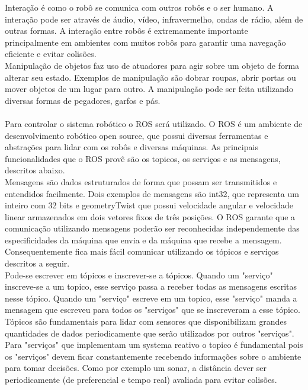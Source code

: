 \documentclass{article}
\begin{document}
Interação é como o robô se comunica com outros robôs e o ser humano. A interação pode ser através de áudio, vídeo, infravermelho, ondas de rádio, além de outras formas. A interação entre robôs é extremamente importante principalmente em ambientes com muitos robôs para garantir uma navegação eficiente e evitar colisões.\\

Manipulação de objetos faz uso de atuadores para agir sobre um objeto de forma alterar seu estado. Exemplos de manipulação são dobrar roupas, abrir portas ou mover objetos de um lugar para outro. A manipulação pode ser feita utilizando diversas formas de pegadores, garfos e pás. \\ \\

Para controlar o sistema robótico o ROS será utilizado. O ROS é um ambiente de desenvolvimento robótico open source, que possui diversas ferramentas e abstrações para lidar com os robôs e diversas máquinas. As principais funcionalidades que o ROS provê são os topicos, os serviços e as mensagens, descritos abaixo.\\
	Mensagens são dados estruturados de forma que possam ser transmitidos e entendidos facilmente. Dois exemplos de mensagens são int32, que representa um inteiro com 32 bits e geometryTwist que possui velocidade angular e velocidade linear armazenados em dois vetores fixos de três posições. O ROS garante que a comunicação utilizando mensagens poderão ser reconhecidas independemente das especificidades da máquina que envia e da máquina que recebe a mensagem. Consequentemente fica mais fácil comunicar utilizando os tópicos e serviços descritos a seguir.\\
	
	Pode-se escrever em tópicos e inscrever-se a tópicos. Quando um "serviço" inscreve-se a um topico, esse serviço passa a receber todas as mensagens escritas nesse tópico. Quando um "serviço" escreve em um topico, esse "serviço" manda a mensagem que escreveu para todos os "serviços" que se inscreveram a esse tópico. Tópicos são fundamentais para lidar com sensores que disponibilizam grandes quantidades de dados periodicamente que serão utilizados por outros "serviços". Para "serviços" que implementam um systema reativo o topico é fundamental pois os "serviços" devem ficar constantemente recebendo informações sobre o ambiente para tomar decisões. Como por exemplo um sonar, a distância dever ser periodicamente (de preferencial e tempo real) avaliada para evitar colisões.\\
\end{document}
